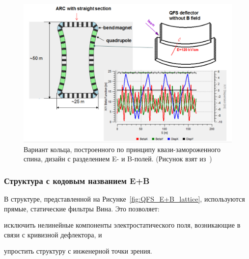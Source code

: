 \begin{figure}[h!]
	\centering
	\includegraphics[width=\linewidth]{images/chapter2/6_3_lattice}
	\caption{Вариант кольца, построенного по принципу квази-замороженного спина, дизайн с разделением E- и B-полей. (Рисунок взят из~\cite{Senichev:Lattices})\label{fig:QFS_6_3_lattice}}
\end{figure}

\subsubsection{Структура с кодовым названием E+B}\label{chpt2:lattice:QFS:EB}

В структуре, представленной на Рисунке~\ref{fig:QFS_E+B_lattice}, используются прямые, статические фильтры Вина. Это позволяет:
\begin{enumerate*}
	\item исключить нелинейные компоненты электростатического поля, возникающие в связи с кривизной дефлектора, и 
	\item упростить структуру с инженерной точки зрения.
\end{enumerate*}

